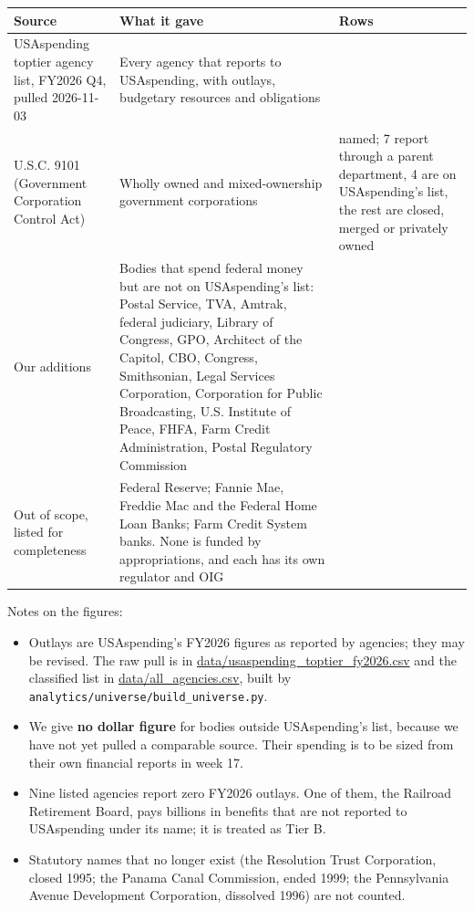 \documentclass[letterpaper,11pt]{article}
\providecommand{\tightlist}{\setlength{\itemsep}{0pt}\setlength{\parskip}{0pt}}
\begin{document}
\begingroup\small\setlength{\tabcolsep}{4pt}\renewcommand{\arraystretch}{1.25}
\begin{longtable}[l]{@{}>{\raggedright\arraybackslash}p{}>{\raggedright\arraybackslash}p{}>{\raggedright\arraybackslash}p{}@{}}
\rowcolor{coolblack}\leavevmode\color{white}\bfseries Source & \leavevmode\color{white}\bfseries What it gave & \leavevmode\color{white}\bfseries Rows \\
\endhead
USAspending toptier agency list, FY2026 Q4, pulled 2026-11-03 & Every agency that reports to USAspending, with outlays, budgetary resources and obligations & 111 \\
31 U.S.C. 9101 (Government Corporation Control Act) & Wholly owned and mixed-ownership government corporations & 26 named; 7 report through a parent department, 4 are on USAspending's list, the rest are closed, merged or privately owned \\
Our additions & Bodies that spend federal money but are not on USAspending's list: Postal Service, TVA, Amtrak, federal judiciary, Library of Congress, GPO, Architect of the Capitol, CBO, Congress, Smithsonian, Legal Services Corporation, Corporation for Public Broadcasting, U.S. Institute of Peace, FHFA, Farm Credit Administration, Postal Regulatory Commission & 16 \\
Out of scope, listed for completeness & Federal Reserve; Fannie Mae, Freddie Mac and the Federal Home Loan Banks; Farm Credit System banks. None is funded by appropriations, and each has its own regulator and OIG & 3 \\
\end{longtable}\endgroup

Notes on the figures:

\begin{itemize}
\tightlist
\item
  Outlays are USAspending's FY2026 figures as reported by agencies; they
  may be revised. The raw pull is in
  \url{data/usaspending_toptier_fy2026.csv} and the classified list in
  \url{data/all_agencies.csv}, built by
  \texttt{analytics/universe/build\_universe.py}.
\item
  We give \textbf{no dollar figure} for bodies outside USAspending's
  list, because we have not yet pulled a comparable source. Their
  spending is to be sized from their own financial reports in week 17.
\item
  Nine listed agencies report zero FY2026 outlays. One of them, the
  Railroad Retirement Board, pays billions in benefits that are not
  reported to USAspending under its name; it is treated as Tier B.
\item
  Statutory names that no longer exist (the Resolution Trust
  Corporation, closed 1995; the Panama Canal Commission, ended 1999; the
  Pennsylvania Avenue Development Corporation, dissolved 1996) are not
  counted.
\end{itemize}
\end{document}
